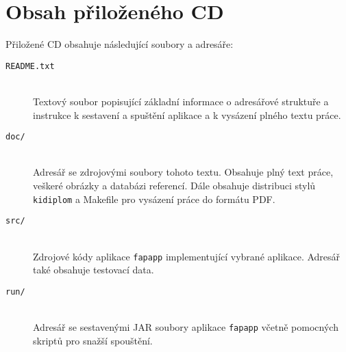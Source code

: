 \documentclass[
  master,
  field=inf,
  biblatex=true,
  language=czech,
  theorems=false,
  sourcecodes=false,
  glossaries=false,
  index=false,
]{kidiplom}
\numberwithin{definition}{section}
\numberwithin{theorem}{section}
\numberwithin{note}{section}
\numberwithin{example}{section}
\begin{document}
\section{Obsah přiloženého CD} \label{sec:ObsahCD}

Přiložené CD obsahuje následující soubory a adresáře:
\begin{description}

\item[\texttt{README.txt}] \hfill \\
  Textový soubor popisující základní informace o adresářové struktuře a instrukce k sestavení a spuštění aplikace a k vysázení plného textu práce.

\item[\texttt{doc/}] \hfill \\
  Adresář se zdrojovými soubory tohoto textu. Obsahuje plný text práce, veškeré obrázky a databázi referencí. Dále obsahuje distribuci stylů \verb|kidiplom| a Makefile pro vysázení práce do formátu PDF.

\item[\texttt{src/}] \hfill \\
  Zdrojové kódy aplikace \verb|fapapp| implementující vybrané aplikace. Adresář také obsahuje testovací data. 
  
\item[\texttt{run/}] \hfill \\
  Adresář se sestavenými JAR soubory aplikace \verb|fapapp| včetně pomocných skriptů pro snažší spouštění.

\end{description}




\nocite{*}

\begin{sloppypar}
\printbibliography
\end{sloppypar}
\end{document}
